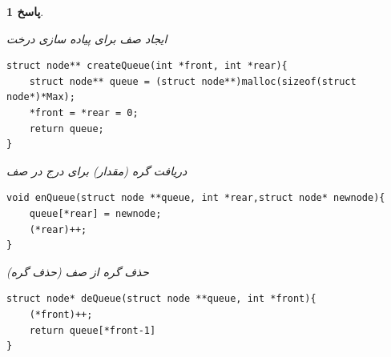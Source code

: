 \documentclass[12pt]{article}
\newtheorem{answer}{پاسخ}[section]
\begin{document}
\begin{answer}
\begin{flushright}
ایجاد صف برای پیاده سازی درخت
\begin{latin}
\begin{lstlisting}
struct node** createQueue(int *front, int *rear){
	struct node** queue = (struct node**)malloc(sizeof(struct node*)*Max);
	*front = *rear = 0;
	return queue;
}
\end{lstlisting}
\end{latin}
\end{flushright}
\begin{flushright}
دریافت گره (مقدار) برای درج در صف
\begin{latin}
\begin{lstlisting}
void enQueue(struct node **queue, int *rear,struct node* newnode){
	queue[*rear] = newnode;
	(*rear)++;
}
\end{lstlisting}
\end{latin}
\end{flushright}
\begin{flushright}
حذف گره از صف (حذف گره)
\begin{latin}
\begin{lstlisting}
struct node* deQueue(struct node **queue, int *front){
	(*front)++;
	return queue[*front-1]
}
\end{lstlisting}
\end{latin}
\end{flushright}





\end{answer}
\end{document}
